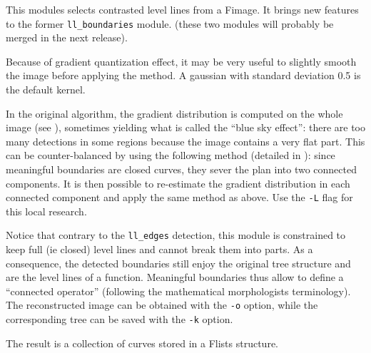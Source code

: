 
This modules selects contrasted level lines from a Fimage.
It brings new features to the former \verb+ll_boundaries+ module.
(these two modules will probably be merged in the next release).

\medskip

Because of gradient quantization effect, it may be very useful to slightly 
smooth the image before applying the method. A gaussian with standard deviation
0.5 is the default kernel. 

\medskip
In the original algorithm, the gradient distribution is computed on the whole 
image (see \cite{desolneux.moisan.ea:edge}), sometimes yielding what is called the ``blue sky effect'':
there are too many detections in some regions because the image contains a very
flat part. This can be counter-balanced by using the following method (detailed
in \cite{cao.muse.sur:shape}): since meaningful boundaries are closed curves, they sever the plan
into two connected components. It is then possible to re-estimate the gradient
distribution in each connected component and apply the same method as
above. Use the \verb+-L+ flag for this local research. 


\medskip
Notice that contrary to the \verb+ll_edges+ detection, this 
module is constrained to keep full (ie closed) level lines and 
cannot break them into parts. As a consequence, the detected boundaries still
enjoy the original tree structure and are the level lines of a function. 
Meaningful boundaries thus allow to define a ``connected operator'' (following
the mathematical morphologists terminology). The reconstructed image can be
obtained with the \verb+-o+ option, while the corresponding tree can be
saved with the \verb+-k+ option. 


\medskip

The result is a collection of curves stored in a Flists structure.

